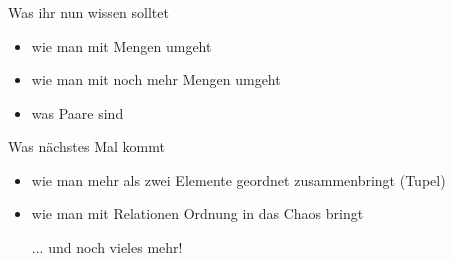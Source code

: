 \begin{frame}
	\frametitle{}
	
	\begin{block}{Was ihr nun wissen solltet}
		\begin{itemize}
			\item wie man mit Mengen umgeht
			\item wie man mit noch mehr Mengen umgeht
			\item was Paare sind
		\end{itemize}
	\end{block}

	\begin{block}{Was nächstes Mal kommt}
		\begin{itemize}
			\item wie man mehr als zwei Elemente geordnet zusammenbringt (Tupel)
			\item wie man mit Relationen Ordnung in das Chaos bringt
			\item [...] und noch vieles mehr!
		\end{itemize}
	\end{block}
\end{frame}


\slideThanks


